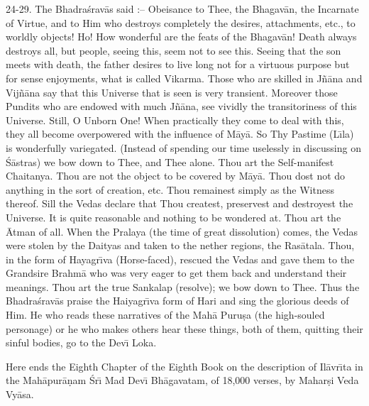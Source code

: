 24-29. The Bhadra\'srav\=as said :-- Obeisance to Thee, the Bhagav\=an, the Incarnate of Virtue, and to Him who destroys completely the desires, attachments, etc., to worldly objects! Ho! How wonderful are the feats of the Bhagav\=an! Death always destroys all, but people, seeing this, seem not to see this. Seeing that the son meets with death, the father desires to live long not for a virtuous purpose but for sense enjoyments, what is called Vikarma. Those who are skilled in J\~n\=ana and Vij\~n\=ana say that this Universe that is seen is very transient. Moreover those Pundits who are endowed with much J\~n\=ana, see vividly the transitoriness of this Universe. Still, O Unborn One! When practically they come to deal with this, they all become overpowered with the influence of M\=ay\=a. So Thy Pastime (L\={\i}la) is wonderfully variegated. (Instead of spending our time uselessly in discussing on \'S\=astras) we bow down to Thee, and Thee alone. Thou art the Self-manifest Chaitanya. Thou are not the object to be covered by M\=ay\=a. Thou dost not do anything in the sort of creation, etc. Thou remainest simply as the Witness thereof. Sill the Vedas declare that Thou createst, preservest and destroyest the Universe. It is quite reasonable and nothing to be wondered at. Thou art the \=Atman of all. When the Pralaya (the time of great dissolution) comes, the Vedas were stolen by the Daityas and taken to the nether regions, the Ras\=atala. Thou, in the form of Hayagr\={\i}va (Horse-faced), rescued the Vedas and gave them to the Grandsire Brahm\=a who was very eager to get them back and understand their meanings. Thou art the true Sankalap (resolve); we bow down to Thee. Thus the Bhadra\'srav\=as praise the Haiyagr\={\i}va form of Hari and sing the glorious deeds of Him. He who reads these narratives of the Mah\=a Puru\d{s}a (the high-souled personage) or he who makes others hear these things, both of them, quitting their sinful bodies, go to the Dev\={\i} Loka.

Here ends the Eighth Chapter of the Eighth Book on the description of Il\=avr\={\i}ta in the Mah\=apur\=a\d{n}am \'Sr\={\i} Mad Dev\={\i} Bh\=agavatam, of 18,000 verses, by Mahar\d{s}i Veda Vy\=asa.



